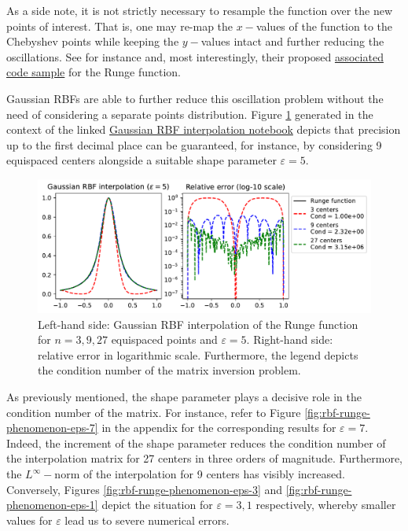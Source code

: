 \documentclass[12pt]{report} %
\begin{document}
As a side note,
it is not strictly necessary to resample the function over the new points of interest. That is, one may re-map the $x-$values of the function to the Chebyshev points while keeping the $y-$values intact and further reducing the oscillations. See for instance \cite{DEMARCHI2021125628} and, most interestingly, their proposed \href{https://github.com/pog87/FakeNodes/blob/master/Runge.ipynb}{associated code sample} for the Runge function.

Gaussian RBFs are able to further reduce this oscillation problem without the need of considering a separate points distribution. Figure \ref{fig:rbf-runge-phenomenon-eps-5-discussion} generated in the context of the linked \href{https://github.com/heqro/tfm-experiments/blob/main/introductory_notebooks/rbf_interpolation/runge_rbf.ipynb}{Gaussian RBF interpolation notebook} depicts that precision up to the first decimal place can be guaranteed, for instance, by considering 9 equispaced centers alongside a suitable shape parameter $\varepsilon=5$.

\begin{figure}[ht]
  \centering
  \includegraphics[width=\textwidth]{imagenes/rbf_interpolation/rbf_runge_5.pdf}
  \caption{Left-hand side: Gaussian RBF interpolation of the Runge function for $n=3,9,27$ equispaced points and $\varepsilon=5$. Right-hand side: relative error in logarithmic scale. Furthermore, the legend depicts the condition number of the matrix inversion problem.}
  \label{fig:rbf-runge-phenomenon-eps-5-discussion}
\end{figure}

As previously mentioned, the shape parameter plays a decisive role in the condition number of the matrix. For instance, refer to Figure \ref{fig:rbf-runge-phenomenon-eps-7} in the appendix for the corresponding results for $\varepsilon=7$. Indeed, the increment of the shape parameter reduces the condition number of the interpolation matrix for 27 centers in three orders of magnitude. Furthermore, the $L^\infty-$norm of the interpolation for 9 centers has visibly increased. Conversely, Figures \ref{fig:rbf-runge-phenomenon-eps-3} and \ref{fig:rbf-runge-phenomenon-eps-1} depict the situation for $\varepsilon=3,1$ respectively, whereby smaller values for $\varepsilon$ lead us to severe numerical errors.
\end{document}
